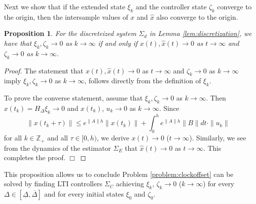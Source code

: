 \documentclass[letterpaper, 12pt, draftcls, onecolumn]{ieeeconf}
\newtheorem{proposition}[theorem]{Proposition}
\begin{document}
Next we show that if the extended state $\xi_k$ and the controller state $\zeta_{k}$
converge to the origin, then
the intersample values of $x$ and $\hat x$ also converge to the origin.
\begin{proposition}
	\label{prop:stability_equivalence}
	For the discreteized system $\Sigma_d$ in Lemma \ref{lem:discretization}, we have
	that $\xi_k, \zeta_{k} \to 0$ as $k \to \infty$ if and only if
	$x(t),\hat x(t) \to 0$ as $t \to \infty$ and $\zeta_{k} \to 0$ as $k \to \infty$.
\end{proposition}
\begin{proof}
	The statement that 
	$x(t),\hat x(t) \to 0$ as $t \to \infty$ and $\zeta_{k} \to 0$ as $k \to \infty$
	imply 
	$\xi_k, \zeta_{k} \to 0$ as $k \to \infty$, follows directly
	from the definition of $\xi_k$.
	
	To prove the converse statement,
	assume that $\xi_k,\zeta_{k} \to 0$ as $k \to \infty$.
	Then $\hat x(t_k) =H_{\Delta}\xi_k \to 0$ and
	$x(t_k)$, $u_k \to 0$ as $k \to \infty$.
	Since
\begin{equation*}
	\|x(t_k+\tau)\| \leq
	e^{\|A\| h} \|x(t_k)\| +
	\int^{h}_0 e^{\|A\| h} \|B\| dt \cdot \|u_k\|
	\end{equation*}
	for all $k \in \mathbb{Z}_+$ and all $\tau \in [0,h)$,
	we derive $x(t) \to 0$ ($t \to \infty$).
	Similarly, we see from the dynamics of the estimator $\Sigma_E$ that
$\hat x(t) \to 0$ as $t \to \infty$.
	This completes the proof.
	\hspace*{\fill} $\Box$
\end{proof}
This proposition allows us to conclude
Problem \ref{problem:clockoffset} can be solved by
finding LTI controllers $\Sigma_C$ achieving $\xi_k$, $\zeta_{k} \to 0$ ($k \to \infty$)
for every $\Delta \in [\underline \Delta, \overline \Delta]$
and for every initial states $\xi_0$ and $\zeta_{0}$.
\end{document}
